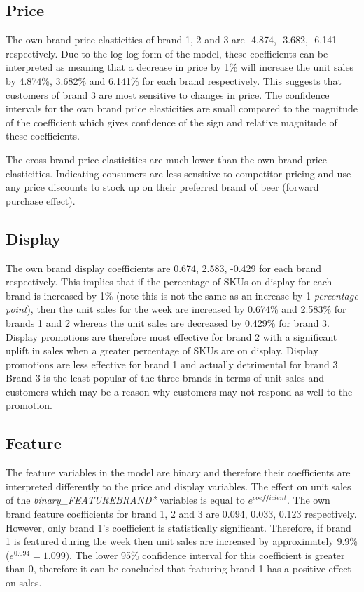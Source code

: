 \documentclass[a4paper,11pt]{article}
\begin{document}
\subsection{Price}

The own brand price elasticities of brand 1, 2 and 3 are -4.874, -3.682, -6.141 respectively. Due to the log-log form of the model, these coefficients can be interpreted as meaning that a decrease in price by 1\% will increase the unit sales by 4.874\%, 3.682\% and 6.141\% for each brand respectively. This suggests that customers of brand 3 are most sensitive to changes in price. The confidence intervals for the own brand price elasticities are small compared to the magnitude of the coefficient which gives confidence of the sign and relative magnitude of these coefficients.

The cross-brand price elasticities are much lower than the own-brand price elasticities. Indicating consumers are less sensitive to competitor pricing and use any price discounts to stock up on their preferred brand of beer (forward purchase effect).


\subsection{Display}

The own brand display coefficients are 0.674, 2.583, -0.429 for each brand respectively. This implies that if the percentage of SKUs on display for each brand is increased by 1\% (note this is not the same as an increase by 1 \textit{percentage point}), then the unit sales for the week are increased by 0.674\% and 2.583\% for brands 1 and 2 whereas the unit sales are decreased by 0.429\% for brand 3. Display promotions are therefore most effective for brand 2 with a significant uplift in sales when a greater percentage of SKUs are on display. Display promotions are less effective for brand 1 and actually detrimental for brand 3. Brand 3 is the least popular of the three brands in terms of unit sales and customers which may be a reason why customers may not respond as well to the promotion.

\subsection{Feature}

The feature variables in the model are binary and therefore their coefficients are interpreted differently to the price and display variables. The effect on unit sales of the \textit{binary\_FEATUREBRAND*} variables is equal to $e^{coefficient}$. The own brand feature coefficients for brand 1, 2 and 3 are 0.094, 0.033, 0.123 respectively. However, only brand 1's coefficient is statistically significant. Therefore, if brand 1 is featured during the week then unit sales are increased by approximately 9.9\% ($e^0.094 = 1.099)$. The lower 95\% confidence interval for this coefficient is greater than 0, therefore it can be concluded that featuring brand 1 has a positive effect on sales.
\end{document}
